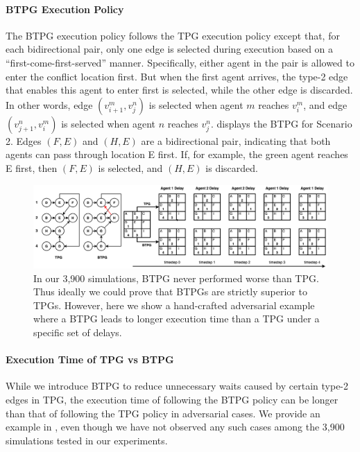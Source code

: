 \documentclass[letterpaper]{article} %
\theoremstyle{definition}
\begin{document}
\paragraph{BTPG Execution Policy}
The BTPG execution policy follows the TPG execution policy except that, for each bidirectional pair, only one edge is selected during execution based on a ``first-come-first-served'' manner. Specifically, either agent in the pair is allowed to enter the conflict location first. But when the first agent arrives, the type-2 edge that enables this agent to enter first is selected, while the other edge is discarded. In other words, edge $(v_{i+1}^m, v_j^n)$ is selected when agent $m$ reaches $v_i^m$, and edge $(v_{j+1}^n, v_{i}^m)$ is selected when agent $n$ reaches $v_j^n$.
 displays the BTPG for Scenario 2.
Edges $(F,E)$ and $(H,E)$ are a bidirectional pair, indicating that both agents can pass through location E first. If, for example, the green agent reaches E first, then $(F,E)$ is selected, and $(H,E)$ is discarded.

\begin{figure}[h]
    \centering
    \includegraphics[width=\textwidth]{Figs/BTPGWorseEx.png}
    \caption{In our 3,900 simulations, BTPG never performed worse than TPG.
    Thus ideally we could prove that BTPGs are strictly superior to TPGs.
    However, here we show a hand-crafted adversarial example where a BTPG leads to longer execution time than a TPG under a specific set of delays.
    }
    \label{fig:counter-ex}
\end{figure}
\paragraph{Execution Time of TPG vs BTPG} While we introduce BTPG to reduce unnecessary waits caused by certain type-2 edges in TPG, the execution time of following the BTPG policy can be longer than that of following the TPG policy in adversarial cases. We provide an example in , even though we have not observed any such cases among the 3,900 simulations tested in our experiments.
\end{document}
